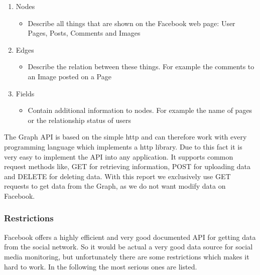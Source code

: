 \documentclass[11pt,titlepage,oneside,openany]{book}
\begin{document}
\begin{enumerate}
   \item Nodes
   \begin{itemize}
     \item Describe all things that are shown on the Facebook web page: User Pages, Posts, Comments and Images
   \end{itemize}
   \item Edges
   \begin{itemize}
     \item Describe the relation between these things. For example the comments to an Image posted on a Page
   \end{itemize}
   \item Fields
   \begin{itemize}
     \item Contain additional information to nodes. For example the name of pages or the relationship status of users
   \end{itemize}
\end{enumerate}

The Graph API is based on the simple \acrfull{http} and can therefore work with every programming language which implements a \acrshort{http} library. Due to this fact it is very easy to implement the API into any application. It supports common request methods like, GET for retrieving information, POST for uploading data and DELETE for deleting data. With this report we exclusively use GET requests to get data from the Graph, as we do not want modify data on Facebook. 


\subsubsection{Restrictions}
\label{subsub:fbrestrictions}

Facebook offers a highly efficient and very good documented API for getting data from the social network. So it would be actual a very good data source for social media monitoring, but unfortunately there are some restrictions which makes it hard to work. In the following the most serious ones are listed.
\end{document}
